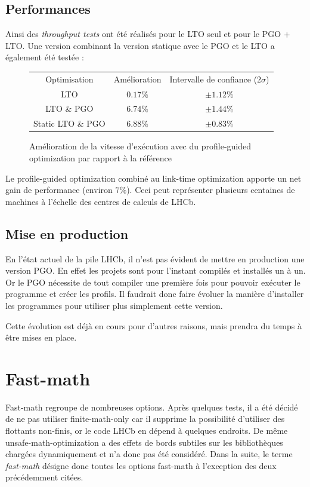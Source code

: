 \documentclass[a4paper,11pt]{report}
\begin{document}
\subsection{Performances}
Ainsi des \emph{throughput tests} ont été réalisés pour le LTO seul et pour le PGO + LTO.
Une version combinant la version statique avec le PGO et le LTO a également été testée :
\begin{figure}[H]
    \begin{center}
        \begin{tabular}{ c c c }
            Optimisation      & Amélioration & Intervalle de confiance ($2\sigma$) \\
            LTO               & $0.17\%$     & $\pm 1.12\%$                        \\
            LTO \& PGO        & $6.74\%$     & $\pm 1.44\%$                        \\
            Static LTO \& PGO & $6.88\%$     & $\pm 0.83\%$
        \end{tabular}
    \end{center}
    \caption{Amélioration de la vitesse d'exécution avec du profile-guided optimization par rapport à la référence}
    \label{results_pgo}
\end{figure}

Le profile-guided optimization combiné au link-time optimization apporte un net gain de performance (environ $7\%$).
Ceci peut représenter plusieurs centaines de machines à l'échelle des centres de calculs de LHCb.

\subsection{Mise en production}
En l'état actuel de la pile LHCb, il n'est pas évident de mettre en production une version PGO.
En effet les projets sont pour l'instant compilés et installés un à un.
Or le PGO nécessite de tout compiler une première fois pour pouvoir exécuter le programme et créer les profils.
Il faudrait donc faire évoluer la manière d'installer les programmes pour utiliser plus simplement cette version.

Cette évolution est déjà en cours pour d'autres raisons, mais prendra du temps à être mises en place.

\section{Fast-math}
Fast-math regroupe de nombreuses options.
Après quelques tests, il a été décidé de ne pas utiliser finite-math-only car il supprime la possibilité d'utiliser des flottants non-finis, or le code LHCb en dépend à quelques endroits.
De même unsafe-math-optimization a des effets de bords subtiles sur les bibliothèques chargées dynamiquement et n'a donc pas été considéré.
Dans la suite, le terme \emph{fast-math} désigne donc toutes les options fast-math à l'exception des deux précédemment citées.
\end{document}
